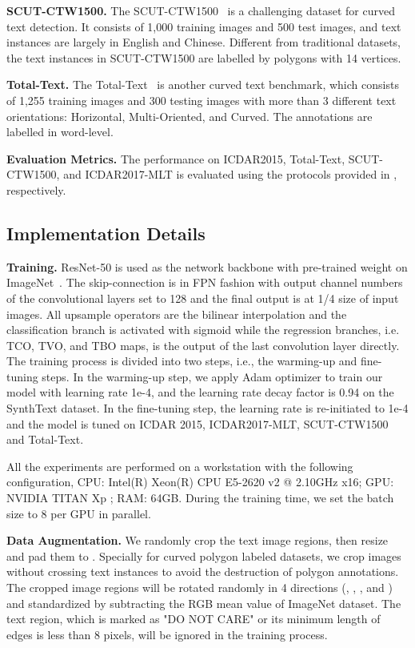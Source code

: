 \documentclass[sigconf]{acmart}
\begin{document}
\textbf{SCUT-CTW1500.} The SCUT-CTW1500~\cite{yuliang2017detecting} is a challenging dataset for curved text detection. It consists of 1,000 training images and 500 test images, and text instances are largely in English and Chinese. Different from traditional datasets, the text instances in SCUT-CTW1500 are labelled by polygons with 14 vertices.

\textbf{Total-Text.} The Total-Text~\cite{ch2017total} is another curved text benchmark, which consists of 1,255 training images and 300 testing images with more than 3 different text orientations: Horizontal, Multi-Oriented, and Curved. The annotations are labelled in word-level.



\textbf{Evaluation Metrics.} The performance on ICDAR2015, Total-Text, SCUT-CTW1500, and ICDAR2017-MLT is evaluated using the protocols provided in \cite{karatzas2015icdar, ch2017total, yuliang2017detecting, nayef2017icdar2017}, respectively.

\subsection{Implementation Details}
\textbf{Training.} ResNet-50 is used as the network backbone with pre-trained weight on ImageNet~\cite{deng2009imagenet}. The skip-connection is in FPN fashion with output channel numbers of the convolutional layers set to 128 and the final output is at 1/4 size of input images. All upsample operators are the bilinear interpolation and the classification branch is activated with sigmoid while the regression branches, i.e. TCO, TVO, and TBO maps, is the output of the last convolution layer directly. The training process is divided into two steps, i.e., the warming-up and fine-tuning steps. In the warming-up step, we apply Adam optimizer to train our model with learning rate 1e-4, and the learning rate decay factor is 0.94 on the SynthText dataset. In the fine-tuning step, the learning rate is re-initiated to 1e-4 and the model is tuned on ICDAR 2015, ICDAR2017-MLT, SCUT-CTW1500 and Total-Text.

All the experiments are performed on a workstation with the following configuration, CPU: Intel(R) Xeon(R) CPU E5-2620 v2 @ 2.10GHz x16; GPU: NVIDIA TITAN Xp ; RAM: 64GB. During the training time, we set the batch size to 8 per GPU in parallel. 


\textbf{Data Augmentation.} We randomly crop the text image regions, then resize and pad them to . Specially for curved polygon labeled datasets, we crop images without crossing text instances to avoid the destruction of polygon annotations. The cropped image regions will be rotated randomly in 4 directions (, , , and ) and standardized by subtracting the RGB mean value of ImageNet dataset. The text region, which is marked as "DO NOT CARE" or its minimum length of edges is less than 8 pixels, will be ignored in the training process.
\end{document}
